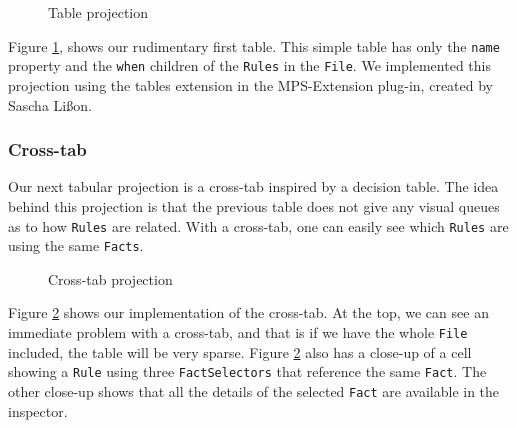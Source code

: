 \begin{figure}[h]
    \centering
    \caption{Table projection}
    \label{fig:tableProjection1}
\end{figure}
Figure \ref{fig:tableProjection1}, shows our rudimentary first table.
This simple table has only the \texttt{name} property and the \texttt{when} children of the \texttt{Rules} in the \texttt{File}.
We implemented this projection using the tables extension in the MPS-Extension plug-in, created by Sascha Lißon.

\subsubsection{Cross-tab}
Our next tabular projection is a cross-tab inspired by a decision table.
The idea behind this projection is that the previous table does not give any visual queues as to how \texttt{Rules} are related.
With a cross-tab, one can easily see which \texttt{Rules} are using the same \texttt{Facts}.

\begin{figure}[h]
    \centering
    \caption{Cross-tab projection}
    \label{fig:crosstabProjection1}
\end{figure}

Figure \ref{fig:crosstabProjection1} shows our implementation of the cross-tab.
At the top, we can see an immediate problem with a cross-tab, and that is if we have the whole \texttt{File} included, the table will be very sparse.
Figure \ref{fig:crosstabProjection1} also has a close-up of a cell showing a \texttt{Rule} using three \texttt{FactSelectors} that reference the same \texttt{Fact}.
The other close-up shows that all the details of the selected \texttt{Fact} are available in the inspector.

